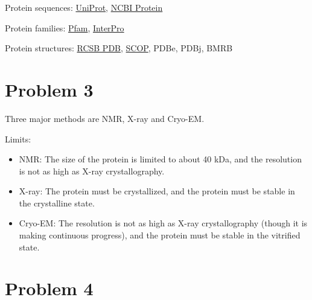 \documentclass{article}
\begin{document}
Protein sequences: \href{https://www.uniprot.org/}{UniProt}, \href{https://www.ncbi.nlm.nih.gov/protein/}{NCBI Protein}

Protein families: \href{http://pfam.xfam.org/}{Pfam}, \href{https://www.ebi.ac.uk/interpro/}{InterPro}

Protein structures: \href{https://www.rcsb.org/}{RCSB PDB}, \href{https://www.ebi.ac.uk/pdbe/scop/}{SCOP}, PDBe, PDBj, BMRB

\section{Problem 3}

Three major methods are NMR, X-ray and Cryo-EM.

Limits:

\begin{itemize}
    \item NMR: The size of the protein is limited to about 40 kDa, and the resolution is not as high as X-ray crystallography.
    \item X-ray: The protein must be crystallized, and the protein must be stable in the crystalline state.
    \item Cryo-EM: The resolution is not as high as X-ray crystallography (though it is making continuous progress), and the protein must be stable in the vitrified state.
\end{itemize}

\section{Problem 4}
\end{document}
